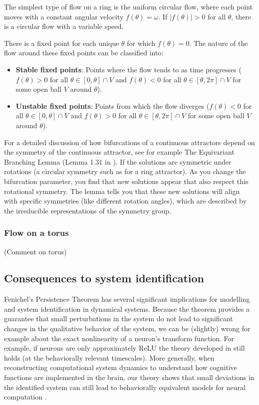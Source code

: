 \documentclass{article} %
\newcommand{\ascomment}[1]{\textcolor{ascolor}{(#1)}}
\newcounter{ct}
\theoremstyle{definition}
\theoremstyle{remark}
\begin{document}
The simplest type of flow on a ring is the uniform circular flow, where each point moves with a constant angular velocity \(f(\theta)=\omega\).
If \(|f(\theta)|>0\) for all \(\theta\), there is a circular flow with a variable speed.

There is a fixed point for each unique \(\theta\) for which \(f(\theta)=0\).
The nature of the flow around these fixed points can be classified into:
\begin{itemize}
\item\textbf{Stable fixed points}: Points where the flow tends to as time progresses (\(f(\theta)>0\) for all \( \theta\in[0,\theta]\cap V\) and \(f(\theta)<0\) for all \( \theta\in[\theta, 2\pi]\cap V\) for some open ball \(V\) around \(\theta\)).
\item\textbf{Unstable fixed points}: Points from which the flow diverges (\(f(\theta)<0\) for all \( \theta\in[0,\theta]\cap V\) and \(f(\theta)>0\) for all \( \theta\in[\theta, 2\pi]\cap V\) for some open ball \(V\) around \(\theta\)).
\end{itemize}


For a detailed discussion of how bifurcations of a continuous attractors depend on the symmetry of the continuous attractor, see for example The Equivariant Branching Lemma (Lemma 1.31 in \citep{golubitsky2002symmetry}).
If the solutions are symmetric under rotations (a circular symmetry such as for a ring attractor).
As you change the bifurcation parameter, you find that new solutions appear that also respect this rotational symmetry.
The lemma tells you that these new solutions will align with specific symmetries (like different rotation angles), which are described by the irreducible representations of the symmetry group.



\subsubsection{Flow on a torus}
\ascomment{Comment on torus}


\subsection{Consequences to system identification}
Fenichel's Persistence Theorem has several significant implications for modelling and system identification in dynamical systems.
Because the theorem provides a guarantee that small perturbations in the system do not lead to significant changes in the qualitative behavior of the system,
we can be (slightly) wrong for example about the exact nonlinearity of a neuron's transform function.
For example, if neurons are only approximately ReLU the theory developed in \citep{biswas2022geometric} still holds (at the behaviorally relevant timescales).
More generally, when reconstructing computational system dynamics to understand how cognitive functions are implemented in the brain, our theory shows that small deviations in the identified system can still lead to behaviorally equivalent models for neural computation \citep{durstewitz2023reconstructing}.
\end{document}
